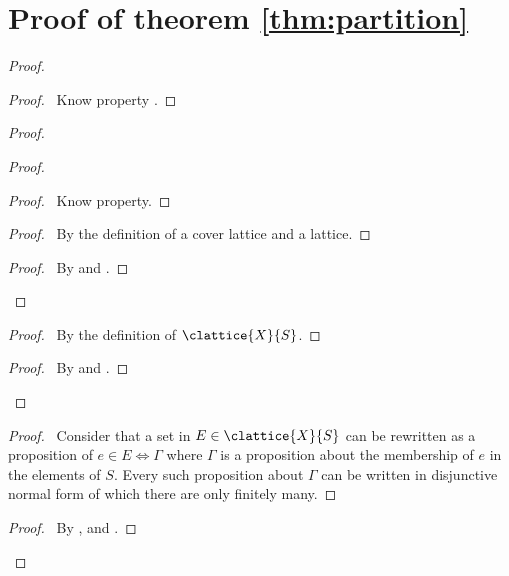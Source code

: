 \section{Proof of theorem \ref{thm:partition}}

\partition*

\begin{proof}
    \pf\
    \begin{proof}
        \pf\ Know property \cite{moller_statitc_nodate}.
    \end{proof}
    \begin{proof}
        \begin{proof}
            \begin{proof}
                \pf\ Know property.
            \end{proof}
            \begin{proof}
                \pf\ By the definition of a cover lattice and a lattice.
            \end{proof}
            \qedstep
            \begin{proof}
                \pf\ By  and .
            \end{proof}
        \end{proof}
        \begin{proof}
            \pf\ By the definition of $\clattice{X}{S}$.
        \end{proof}
        \qedstep
        \begin{proof}
            \pf\ By  and .
        \end{proof}
    \end{proof}
    \begin{proof}
        \pf\ Consider that a set in $E \in \clattice{X}{S}$ can be rewritten as a proposition of $e \in E \iff \Gamma$ where $\Gamma$ is a proposition about the membership of $e$ in the elements of $S$. Every such proposition about $\Gamma$ can be written in disjunctive normal form of which there are only finitely many.
    \end{proof}
    \qedstep
    \begin{proof}
        \pf\ By ,  and .
    \end{proof}
\end{proof}

